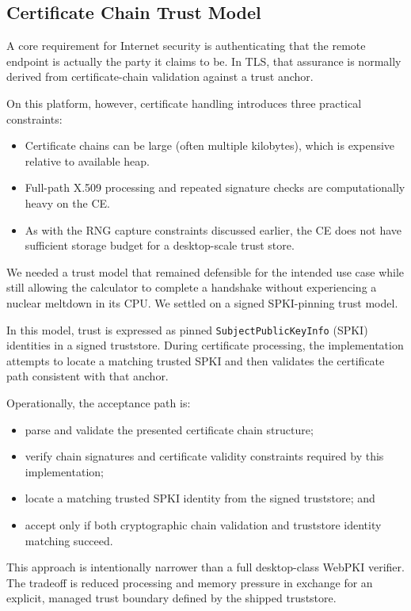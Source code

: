 \documentclass[titlepage]{report}
\begin{document}
	\subsection{Certificate Chain Trust Model}
	A core requirement for Internet security is authenticating that the remote endpoint is actually the party it claims to be. In TLS, that assurance is normally derived from certificate-chain validation against a trust anchor.
	
	On this platform, however, certificate handling introduces three practical constraints:
	\begin{itemize}
		\item Certificate chains can be large (often multiple kilobytes), which is expensive relative to available heap.
		\item Full-path X.509 processing and repeated signature checks are computationally heavy on the CE.
		\item As with the RNG capture constraints discussed earlier, the CE does not have sufficient storage budget for a desktop-scale trust store.
	\end{itemize}
	We needed a trust model that remained defensible for the intended use case while still allowing the calculator to complete a handshake without experiencing a nuclear meltdown in its CPU. We settled on a signed SPKI-pinning trust model.
	
	In this model, trust is expressed as pinned \texttt{SubjectPublicKeyInfo} (SPKI) identities in a signed truststore. During certificate processing, the implementation attempts to locate a matching trusted SPKI and then validates the certificate path consistent with that anchor.
	
	Operationally, the acceptance path is:
	\begin{itemize}
		\item parse and validate the presented certificate chain structure;
		\item verify chain signatures and certificate validity constraints required by this implementation;
		\item locate a matching trusted SPKI identity from the signed truststore; and
		\item accept only if both cryptographic chain validation and truststore identity matching succeed.
	\end{itemize}
	
	This approach is intentionally narrower than a full desktop-class WebPKI verifier. The tradeoff is reduced processing and memory pressure in exchange for an explicit, managed trust boundary defined by the shipped truststore.
	
\end{document}
